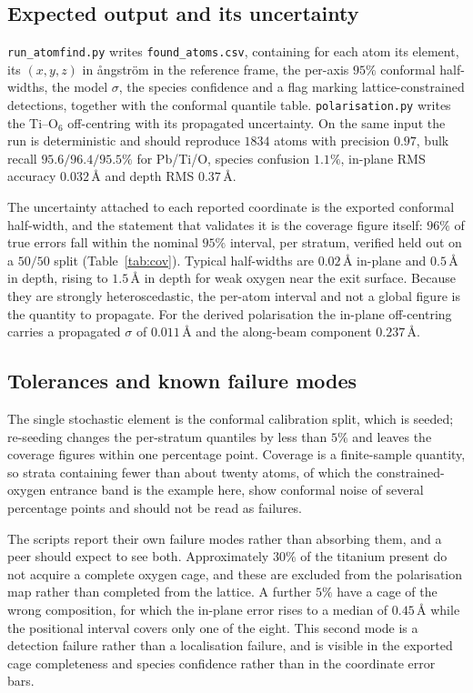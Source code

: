 \documentclass[aps,prb,twocolumn,superscriptaddress,floatfix,nofootinbib]{revtex4-2}
\begin{document}
\subsection{Expected output and its uncertainty}

\texttt{run\_atomfind.py} writes \texttt{found\_atoms.csv}, containing for each atom its element, its
$(x,y,z)$ in \aa{}ngstr\"om in the reference frame, the per-axis $95\%$ conformal half-widths,
the model $\sigma$, the species confidence and a flag marking lattice-constrained detections,
together with the conformal quantile table. \texttt{polarisation.py} writes the Ti--O$_6$ off-centring with
its propagated uncertainty. On the same input the run is deterministic and should reproduce
$1834$ atoms with precision $0.97$, bulk recall $95.6/96.4/95.5\%$ for Pb/Ti/O, species confusion
$1.1\%$, in-plane RMS accuracy $0.032$\,\AA{} and depth RMS $0.37$\,\AA.

The uncertainty attached to each reported coordinate is the exported conformal half-width, and
the statement that validates it is the coverage figure itself: $96\%$ of true errors fall within
the nominal $95\%$ interval, per stratum, verified held out on a $50/50$ split
(Table~\ref{tab:cov}). Typical half-widths are $0.02$\,\AA{} in-plane and $0.5$\,\AA{} in depth,
rising to $1.5$\,\AA{} in depth for weak oxygen near the exit surface. Because they are strongly
heteroscedastic, the per-atom interval and not a global figure is the quantity to propagate. For
the derived polarisation the in-plane off-centring carries a propagated $\sigma$ of
$0.011$\,\AA{} and the along-beam component $0.237$\,\AA.

\subsection{Tolerances and known failure modes}

The single stochastic element is the conformal calibration split, which is seeded; re-seeding
changes the per-stratum quantiles by less than $5\%$ and leaves the coverage figures within one
percentage point. Coverage is a finite-sample quantity, so strata containing fewer than about
twenty atoms, of which the constrained-oxygen entrance band is the example here, show
conformal noise of several percentage points and should not be read as failures.

The scripts report their own failure modes rather than absorbing them, and a peer should expect
to see both. Approximately $30\%$ of the titanium present do not acquire a complete oxygen cage, and
these are excluded from the polarisation map rather than completed from the lattice. A further
$5\%$ have a cage of the wrong composition, for which the in-plane error rises to a median of
$0.45$\,\AA{} while the positional interval covers only one of the eight. This second mode is a
detection failure rather than a localisation failure, and is visible in the exported cage
completeness and species confidence rather than in the coordinate error bars.
\end{document}
